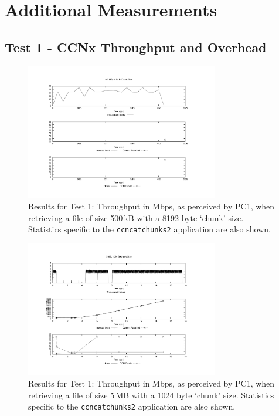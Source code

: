 \chapter{Additional Measurements}
\label{app:meas}

\section{Test 1 - CCNx Throughput and Overhead}
\label{app:res-throughput-overhead}

\begin{figure}[H]

    \centering
    \includegraphics[width=0.75\textwidth]{figures/udp_0_5_8192.pdf}
    \cprotect\caption{Results for Test 1: Throughput in Mbps, as perceived by 
        PC1, when retrieving a file of size 500\,kB with a 8192 byte 
        `chunk' size. Statistics specific to the \verb+ccncatchunks2+ application 
        are also shown.}
    \label{fig:test-1-thpt-0_5-8192}

\end{figure}

\begin{figure}[H]

    \centering
    \includegraphics[width=0.75\textwidth]{figures/udp_5_1024.pdf}
    \cprotect\caption{Results for Test 1: Throughput in Mbps, as perceived by 
        PC1, when retrieving a file of size 5\,MB with a 1024 byte 
        `chunk' size. Statistics specific to the \verb+ccncatchunks2+ application 
        are also shown.}
    \label{fig:test-1-thpt-5-1024}

\end{figure}

